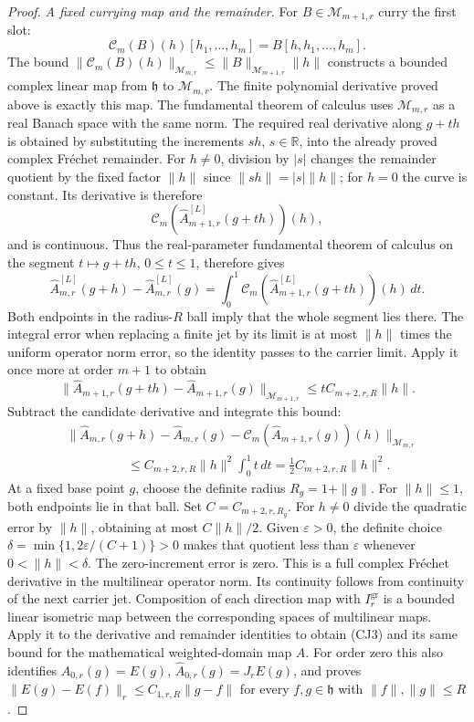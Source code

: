 \documentclass[11pt,a4paper]{article}
\theoremstyle{definition}
\theoremstyle{remark}
\begin{document}
\begin{proof}
\emph{A fixed currying map and the remainder.}
For $B\in\mathcal M_{m+1,r}$ curry the first slot:
\[\mathcal C_m(B)(h)[h_1,\ldots,h_m]=B[h,h_1,\ldots,h_m].\]
The bound
$\|\mathcal C_m(B)(h)\|_{\mathcal M_{m,r}}
 \leq\|B\|_{\mathcal M_{m+1,r}}\|h\|$
constructs a bounded complex linear map from $\mathfrak h$
to $\mathcal M_{m,r}$. The finite polynomial derivative
proved above is exactly this map. The fundamental theorem of
calculus uses $\mathcal M_{m,r}$ as a real Banach space with
the same norm. The required real derivative along $g+th$ is
obtained by substituting the increments $sh$, $s\in\mathbb R$,
into the already proved complex Fr\'echet remainder. For
$h\ne0$, division by $|s|$ changes the remainder quotient by
the fixed factor $\|h\|$ since $\|sh\|=|s|\|h\|$;
for $h=0$ the curve is constant. Its derivative is therefore
\[
 \mathcal C_m(\widehat A^{[L]}_{m+1,r}(g+th))(h),
\]
and is continuous. Thus the real-parameter fundamental theorem
of calculus on the segment
$t\mapsto g+th$, $0\leq t\leq1$, therefore gives
\[
 \widehat A^{[L]}_{m,r}(g+h)-\widehat A^{[L]}_{m,r}(g)
 =\int_0^1\mathcal C_m(\widehat A^{[L]}_{m+1,r}(g+th))(h)\,dt.
\]
Both endpoints in the radius-$R$ ball imply that the whole
segment lies there. The integral error when replacing a finite
jet by its limit is at most $\|h\|$ times the uniform operator
norm error, so the identity passes to the carrier limit.
Apply it once more at order $m+1$ to obtain
\[
 \|\widehat A_{m+1,r}(g+th)-\widehat A_{m+1,r}(g)\|_{\mathcal M_{m+1,r}}
       \leq tC_{m+2,r,R}\|h\|.
\]
Subtract the candidate derivative and integrate this bound:
\begin{align*}
 &\|\widehat A_{m,r}(g+h)-\widehat A_{m,r}(g)
       -\mathcal C_m(\widehat A_{m+1,r}(g))(h)\|_{\mathcal M_{m,r}}\\
 &\hspace{2cm}\leq C_{m+2,r,R}\|h\|^2\int_0^1t\,dt
       =\tfrac12C_{m+2,r,R}\|h\|^2.
\end{align*}
At a fixed base point $g$, choose the definite radius
$R_g=1+\|g\|$. For $\|h\|\leq1$, both endpoints lie in
that ball. Set $C=C_{m+2,r,R_g}$. For $h\ne0$ divide the
quadratic error by $\|h\|$, obtaining at most $C\|h\|/2$.
Given $\varepsilon>0$, the definite choice
$\delta=\min\{1,2\varepsilon/(C+1)\}>0$ makes that quotient
less than $\varepsilon$ whenever $0<\|h\|<\delta$.
The zero-increment error is zero. This is a full complex
Fr\'echet derivative in the
multilinear operator norm. Its continuity follows from continuity
of the next carrier jet. Composition of each direction map
with $I_r^{\mathrm{gr}}$ is a bounded linear isometric map
between the corresponding spaces of multilinear maps. Apply it
to the derivative and remainder identities to obtain (CJ3) and
its same bound for the mathematical weighted-domain map $A$.
For order zero this also identifies $A_{0,r}(g)=E(g)$,
$\widehat A_{0,r}(g)=J_rE(g)$, and proves
$\|E(g)-E(f)\|_r\leq C_{1,r,R}\|g-f\|$ for every
$f,g\in\mathfrak h$ with $\|f\|,\|g\|\leq R$.


\end{proof}
\end{document}
